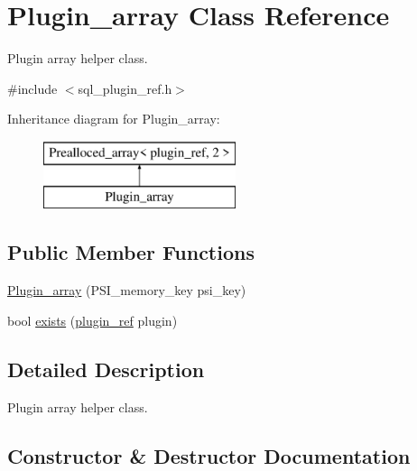 \hypertarget{classPlugin__array}{}\section{Plugin\+\_\+array Class Reference}
\label{classPlugin__array}


Plugin array helper class.  




{\ttfamily \#include $<$sql\+\_\+plugin\+\_\+ref.\+h$>$}

Inheritance diagram for Plugin\+\_\+array\+:\begin{figure}[H]
\begin{center}
\leavevmode
\includegraphics[height=2.000000cm]{classPlugin__array}
\end{center}
\end{figure}
\subsection*{Public Member Functions}
\begin{DoxyCompactItemize}
\item 
\mbox{\hyperlink{classPlugin__array_a0977b64d5034195ae56cbb1d2ccb92f1}{Plugin\+\_\+array}} (P\+S\+I\+\_\+memory\+\_\+key psi\+\_\+key)
\item 
bool \mbox{\hyperlink{classPlugin__array_a48e49d3d735dda412b27b17c2f05c1f9}{exists}} (\mbox{\hyperlink{structst__plugin__int}{plugin\+\_\+ref}} plugin)
\end{DoxyCompactItemize}


\subsection{Detailed Description}
Plugin array helper class. 

\subsection{Constructor \& Destructor Documentation}
\mbox{\label{classPlugin__array_a0977b64d5034195ae56cbb1d2ccb92f1}} 
